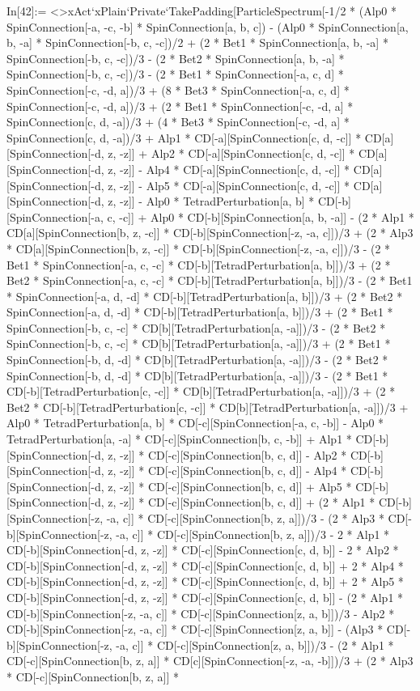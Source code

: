 In[42]:= <>xAct`xPlain`Private`TakePadding[ParticleSpectrum[-1/2 * (Alp0 * SpinConnection[-a, -c, -b] * SpinConnection[a, b, c]) - (Alp0 * SpinConnection[a, b, -a] * SpinConnection[-b, c, -c])/2 + (2 * Bet1 * SpinConnection[a, b, -a] * SpinConnection[-b, c, -c])/3 - (2 * Bet2 * SpinConnection[a, b, -a] * SpinConnection[-b, c, -c])/3 - (2 * Bet1 * SpinConnection[-a, c, d] * SpinConnection[-c, -d, a])/3 + (8 * Bet3 * SpinConnection[-a, c, d] * SpinConnection[-c, -d, a])/3 + (2 * Bet1 * SpinConnection[-c, -d, a] * SpinConnection[c, d, -a])/3 + (4 * Bet3 * SpinConnection[-c, -d, a] * SpinConnection[c, d, -a])/3 + Alp1 * CD[-a][SpinConnection[c, d, -c]] * CD[a][SpinConnection[-d, z, -z]] + Alp2 * CD[-a][SpinConnection[c, d, -c]] * CD[a][SpinConnection[-d, z, -z]] - Alp4 * CD[-a][SpinConnection[c, d, -c]] * CD[a][SpinConnection[-d, z, -z]] - Alp5 * CD[-a][SpinConnection[c, d, -c]] * CD[a][SpinConnection[-d, z, -z]] - Alp0 * TetradPerturbation[a, b] * CD[-b][SpinConnection[-a, c, -c]] + Alp0 * CD[-b][SpinConnection[a, b, -a]] - (2 * Alp1 * CD[a][SpinConnection[b, z, -c]] * CD[-b][SpinConnection[-z, -a, c]])/3 + (2 * Alp3 * CD[a][SpinConnection[b, z, -c]] * CD[-b][SpinConnection[-z, -a, c]])/3 - (2 * Bet1 * SpinConnection[-a, c, -c] * CD[-b][TetradPerturbation[a, b]])/3 + (2 * Bet2 * SpinConnection[-a, c, -c] * CD[-b][TetradPerturbation[a, b]])/3 - (2 * Bet1 * SpinConnection[-a, d, -d] * CD[-b][TetradPerturbation[a, b]])/3 + (2 * Bet2 * SpinConnection[-a, d, -d] * CD[-b][TetradPerturbation[a, b]])/3 + (2 * Bet1 * SpinConnection[-b, c, -c] * CD[b][TetradPerturbation[a, -a]])/3 - (2 * Bet2 * SpinConnection[-b, c, -c] * CD[b][TetradPerturbation[a, -a]])/3 + (2 * Bet1 * SpinConnection[-b, d, -d] * CD[b][TetradPerturbation[a, -a]])/3 - (2 * Bet2 * SpinConnection[-b, d, -d] * CD[b][TetradPerturbation[a, -a]])/3 - (2 * Bet1 * CD[-b][TetradPerturbation[c, -c]] * CD[b][TetradPerturbation[a, -a]])/3 + (2 * Bet2 * CD[-b][TetradPerturbation[c, -c]] * CD[b][TetradPerturbation[a, -a]])/3 + Alp0 * TetradPerturbation[a, b] * CD[-c][SpinConnection[-a, c, -b]] - Alp0 * TetradPerturbation[a, -a] * CD[-c][SpinConnection[b, c, -b]] + Alp1 * CD[-b][SpinConnection[-d, z, -z]] * CD[-c][SpinConnection[b, c, d]] - Alp2 * CD[-b][SpinConnection[-d, z, -z]] * CD[-c][SpinConnection[b, c, d]] - Alp4 * CD[-b][SpinConnection[-d, z, -z]] * CD[-c][SpinConnection[b, c, d]] + Alp5 * CD[-b][SpinConnection[-d, z, -z]] * CD[-c][SpinConnection[b, c, d]] + (2 * Alp1 * CD[-b][SpinConnection[-z, -a, c]] * CD[-c][SpinConnection[b, z, a]])/3 - (2 * Alp3 * CD[-b][SpinConnection[-z, -a, c]] * CD[-c][SpinConnection[b, z, a]])/3 - 2 * Alp1 * CD[-b][SpinConnection[-d, z, -z]] * CD[-c][SpinConnection[c, d, b]] - 2 * Alp2 * CD[-b][SpinConnection[-d, z, -z]] * CD[-c][SpinConnection[c, d, b]] + 2 * Alp4 * CD[-b][SpinConnection[-d, z, -z]] * CD[-c][SpinConnection[c, d, b]] + 2 * Alp5 * CD[-b][SpinConnection[-d, z, -z]] * CD[-c][SpinConnection[c, d, b]] - (2 * Alp1 * CD[-b][SpinConnection[-z, -a, c]] * CD[-c][SpinConnection[z, a, b]])/3 - Alp2 * CD[-b][SpinConnection[-z, -a, c]] * CD[-c][SpinConnection[z, a, b]] - (Alp3 * CD[-b][SpinConnection[-z, -a, c]] * CD[-c][SpinConnection[z, a, b]])/3 - (2 * Alp1 * CD[-c][SpinConnection[b, z, a]] * CD[c][SpinConnection[-z, -a, -b]])/3 + (2 * Alp3 * CD[-c][SpinConnection[b, z, a]] * 